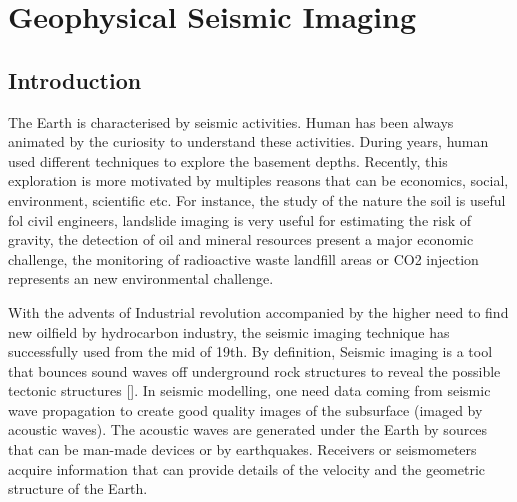 \section{Geophysical Seismic Imaging}
\subsection{Introduction}
 
The Earth is characterised by seismic activities. Human has been always animated by the curiosity to understand these activities. During years, human used different techniques to explore the basement depths. Recently, this exploration is more motivated by multiples reasons that can be economics, social, environment, scientific etc. For instance, the study of the nature the soil is useful fol civil engineers, landslide imaging is very useful for estimating the risk of gravity, the detection of oil and mineral resources present a major economic challenge, the monitoring of radioactive waste landfill areas or CO2 injection represents an new environmental challenge.  

With the advents of Industrial revolution accompanied by the higher need to find new oilfield by hydrocarbon industry, the seismic imaging technique has successfully used from the mid of 19th. By definition, Seismic imaging is a tool that bounces sound waves off underground rock structures to reveal the possible tectonic structures []. In seismic modelling, one need data coming from seismic wave propagation to create good quality images of the subsurface (imaged by acoustic waves). The acoustic waves are generated under the Earth by sources that can be man-made devices or by earthquakes. Receivers or seismometers acquire information that can provide details of the velocity and the geometric structure of the Earth. 


